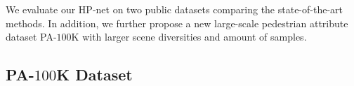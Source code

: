 \documentclass[10pt,twocolumn,letterpaper]{article}
\begin{document}
We evaluate our HP-net on two public datasets comparing the state-of-the-art methods. In addition, we further propose a new large-scale pedestrian attribute dataset PA-$100$K with larger scene diversities and amount of samples.


\subsection{PA-$100$K Dataset}
\label{sub:pa_100k_datasets}




\end{document}
